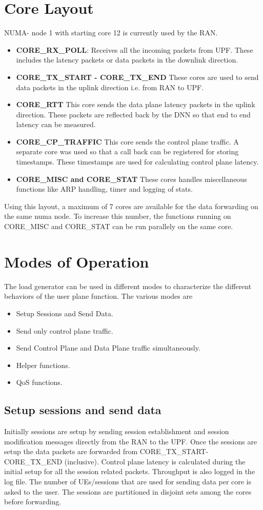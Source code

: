 \documentclass{article}
\begin{document}
\section{Core Layout}
NUMA- node 1 with starting core 12 is currently used by the RAN.
\begin{itemize}
    \item \textbf{CORE\_RX\_POLL}: Receives all the incoming packets from UPF. These includes the latency packets or data packets in the downlink direction.
    \item \textbf{CORE\_TX\_START - CORE\_TX\_END}
          These cores are used to send data packets in the uplink  direction i.e. from RAN to UPF.
    \item \textbf{CORE\_RTT}
          This core sends the data plane latency packets in the uplink direction. These packets are reflected back by the DNN so that end to end latency can be measured.
    \item \textbf{CORE\_CP\_TRAFFIC} This core sends the control plane traffic. A separate core was used so that a call back can be registered for storing timestamps. These timestamps are used for calculating control plane latency.
    \item \textbf{CORE\_MISC and CORE\_STAT}
          These cores handles miscellaneous functions like ARP handling, timer and logging of stats.
\end{itemize}
Using this layout, a maximum of 7 cores are available for the data forwarding on the same numa node. To increase this number, the functions running on CORE\_MISC and CORE\_STAT can be run parallely on the same core.  




\section{Modes of Operation}
The load generator can be used in different modes to characterize the different behaviors of the user plane function. The various modes are
\begin{itemize}
    \item Setup Sessions and Send Data.
    \item Send only control plane traffic.
    \item Send Control Plane and Data Plane traffic simultaneously.
    \item Helper functions.
    \item QoS functions.
\end{itemize}
\subsection{Setup sessions and send data}
Initially sessions are setup by sending session establishment and session modification messages directly from the RAN to the UPF.
Once the sessions are setup the data packets are forwarded from CORE\_TX\_START- CORE\_TX\_END (inclusive). 
Control plane latency is calculated during the initial setup for all the session related packets. Throughput is also logged in the log file.
The number of UEs/sessions that are used for sending data per core is asked to the user. The sessions are partitioned in disjoint sets among the cores before forwarding.
\end{document}
